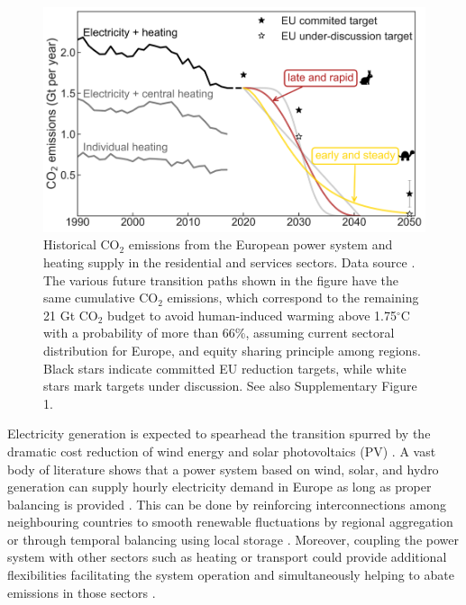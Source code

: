 \documentclass[5p]{elsarticle} %
\begin{document}
\begin{figure}[!h]
\centering
	\includegraphics[width=\columnwidth]{../figures/carbon_budget_2.png}
\caption{Historical CO$_2$ emissions from the European power system and heating supply in the residential and services sectors. Data source \cite{UNFCCC_inventory}. The various future transition paths shown in the figure have the same cumulative CO$_2$ emissions, which correspond to the remaining 21 Gt CO$_2$ budget to avoid human-induced warming above 1.75$^{\circ}$C with a probability of more than 66\%, assuming current sectoral distribution for Europe, and equity sharing principle among regions. Black stars indicate committed EU reduction targets, while white stars mark targets under discussion. See also Supplementary Figure 1.} \label{fig_carbon_budget} 
\end{figure}

\FloatBarrier


Electricity generation is expected to spearhead the transition spurred by the dramatic cost reduction of wind energy \cite{Lantz_2012} and solar photovoltaics (PV) \cite{Creutzig_2017, Haegel_2019}. A vast body of literature shows that a power system based on wind, solar, and hydro generation can supply hourly electricity demand in Europe as long as proper balancing is provided \cite{Eriksen_2017, Schlachtberger_2017, Gils_2017a, Brown_response}. This can be done by reinforcing interconnections among neighbouring countries \cite{Rodriguez_2014} to smooth renewable fluctuations by regional aggregation or through temporal balancing using local storage \cite{Rasmussen_2012, Cebulla_2017, Victoria_2019_storage}. Moreover, coupling the power system with other sectors such as heating or transport could provide additional flexibilities facilitating the system operation and simultaneously helping to abate emissions in those sectors \cite{Connolly_2016, Brown_2018, Child_2019}. \\
\end{document}
